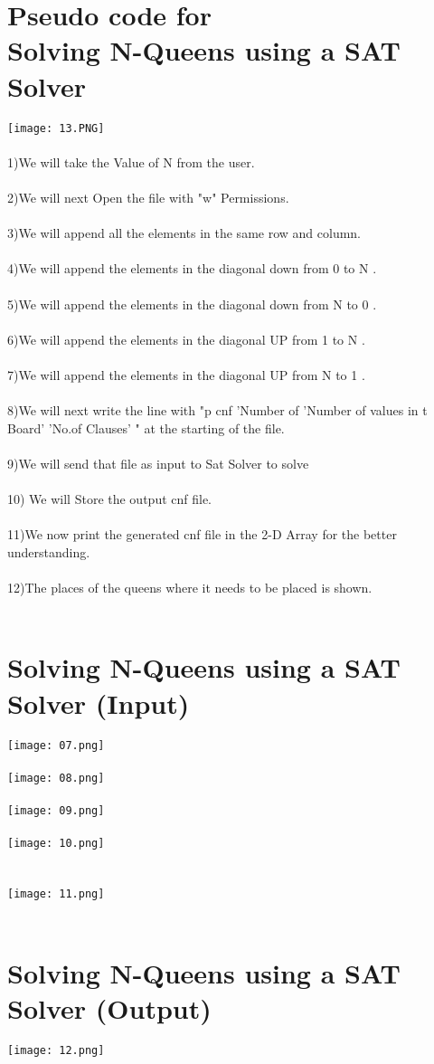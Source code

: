 \documentclass{article}
\begin{document}
\section{Pseudo code for \\
  Solving N-Queens using a SAT Solver 
}
\texttt{[image: 13.PNG]} \\
\\
1)We will take the Value of N from the user.\\ \\
2)We will next Open the file with "w" Permissions.\\ \\
3)We will append all the elements in the same row and column.\\ \\
4)We will append the elements in the diagonal down from 0 to N .\\ \\
5)We will append the elements in the diagonal down from N to 0 .\\ \\
6)We will append the elements in the diagonal UP from 1 to N .\\ \\
7)We will append the elements in the diagonal UP from N to 1 .\\ \\
8)We will next write the line with "p cnf 'Number of 'Number of values in t\\  Board' 'No.of Clauses' " at the starting of the file.\\ \\
9)We will send that file as input to Sat Solver to solve\\ \\
10) We will Store the output cnf file.\\ \\
11)We now print the generated cnf file in the 2-D Array for the better\\ understanding. \\ \\
12)The places of the queens where it needs to be placed is shown.\\ \\

\section{Solving N-Queens using a SAT Solver (Input)}
\texttt{[image: 07.png]} \\
\\
\texttt{[image: 08.png]}\\
\\
\texttt{[image: 09.png]} \\
\\
\texttt{[image: 10.png]}\\
\\
\\\texttt{[image: 11.png]} \\
\\

\section{Solving N-Queens using a SAT Solver (Output)}
\texttt{[image: 12.png]}\\
\\
\end{document}
